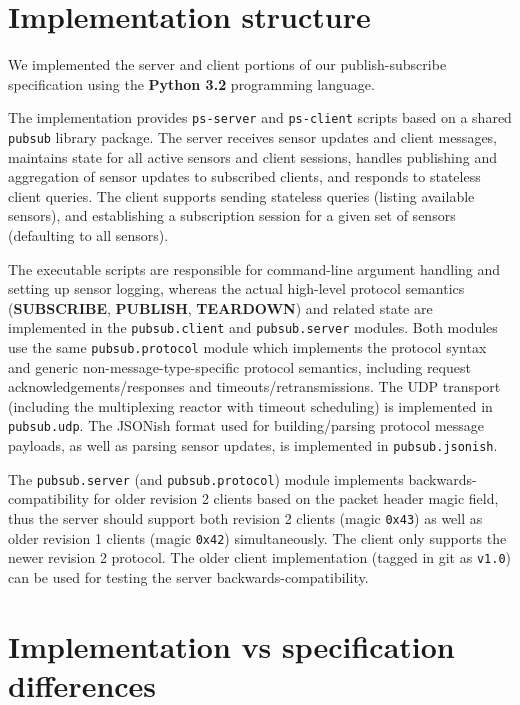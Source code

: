 \documentclass[a4paper]{article}
\begin{document}


\tableofcontents
\newpage

\section{Implementation structure}

We implemented the server and client portions of our publish-subscribe specification using the \textbf{Python 3.2} programming language.

The implementation provides \texttt{ps-server} and \texttt{ps-client} scripts based on a shared \texttt{pubsub} library package.
The server receives sensor updates and client messages, maintains state for all active sensors and client sessions, handles publishing and aggregation of sensor updates to subscribed clients, and responds to stateless client queries.
The client supports sending stateless queries (listing available sensors), and establishing a subscription session for a given set of sensors (defaulting to all sensors).

The executable scripts are responsible for command-line argument handling and setting up sensor logging, whereas the actual high-level protocol semantics (\textbf{SUBSCRIBE}, \textbf{PUBLISH}, \textbf{TEARDOWN}) and related state are implemented in the \texttt{pubsub.client} and \texttt{pubsub.server} modules.
Both modules use the same \texttt{pubsub.protocol} module which implements the protocol syntax and generic non-message-type-specific protocol semantics, including request acknowledgements/responses and timeouts/retransmissions.
The UDP transport (including the multiplexing reactor with timeout scheduling) is implemented in \texttt{pubsub.udp}.
The JSONish format used for building/parsing protocol message payloads, as well as parsing sensor updates, is implemented in \texttt{pubsub.jsonish}.

The \texttt{pubsub.server} (and \texttt{pubsub.protocol}) module implements backwards-compatibility for older revision 2 clients based on the packet header magic field, thus the server should support both revision 2 clients (magic \texttt{0x43}) as well as older revision 1 clients (magic \texttt{0x42}) simultaneously.
The client only supports the newer revision 2 protocol.
The older client implementation (tagged in git as \texttt{v1.0}) can be used for testing the server backwards-compatibility.

\section{Implementation vs specification differences}
\end{document}
